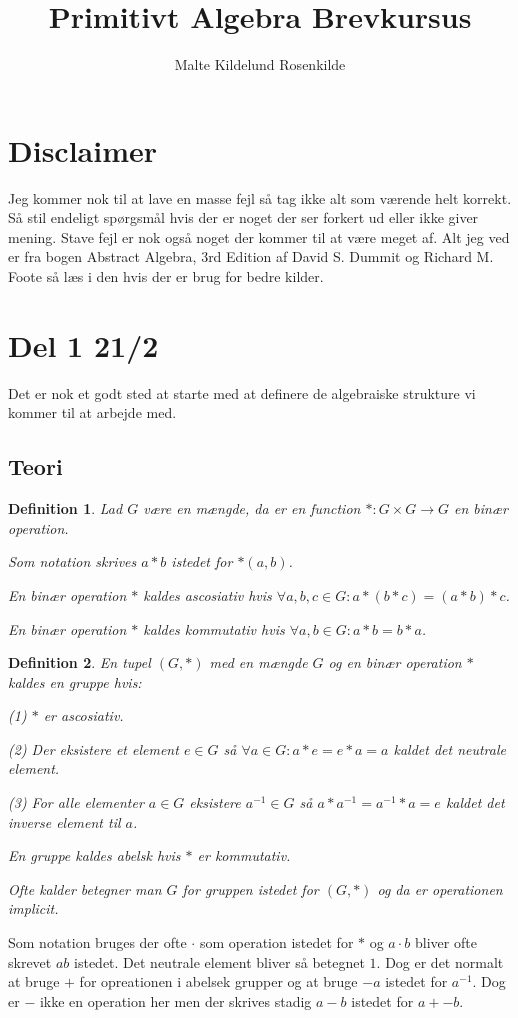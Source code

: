 \documentclass{article}
\title{Primitivt Algebra Brevkursus}
\author{Malte Kildelund Rosenkilde}
\newcommand{\inv}{^{-1}}
\newcommand{\too}{\rightarrow}
\newtheorem{defi}{Definition}
\begin{document}
	\maketitle
	\newpage

	\section*{Disclaimer}
		Jeg kommer nok til at lave en masse fejl så tag ikke alt som værende helt
		korrekt. Så stil endeligt spørgsmål hvis der er noget der ser forkert ud
		eller ikke giver mening.
		Stave fejl er nok også noget der kommer til at være meget af.
		Alt jeg ved er fra bogen
		Abstract Algebra, 3rd Edition af David S. Dummit og Richard M. Foote
		så læs i den hvis der er brug for bedre kilder.
	\section*{Del 1 21/2}
		Det er nok et godt sted at starte med at definere de algebraiske strukture
		vi kommer til at arbejde med.
		\subsection*{Teori}
		\begin{defi}
			Lad $G$ være en mængde, da er en function $*: G \times G \too G$
			en binær operation.

			Som notation skrives $a*b$ istedet for $*(a,b)$.

			En binær operation $*$ kaldes ascosiativ hvis
			$\forall a,b,c \in G: a*(b*c) = (a*b)*c$.

			En binær operation $*$ kaldes kommutativ hvis
			$\forall a,b \in G: a*b = b*a$.
		\end{defi}
		\begin{defi}
			En tupel $(G,*)$ med en mængde $G$ og en binær operation $*$ kaldes
			en gruppe hvis:

			(1) $*$ er ascosiativ.

			(2) Der eksistere et element $e \in G$ så $\forall a \in G: a*e=e*a=a$
			kaldet det neutrale element.

			(3) For alle elementer $a \in G$ eksistere $a\inv \in G$ så
			$a*a\inv = a\inv*a = e$ kaldet det inverse element til $a$.

			En gruppe kaldes abelsk hvis $*$ er kommutativ.

			Ofte kalder betegner man $G$ for gruppen istedet for $(G,*)$ og
			da er operationen implicit.
		\end{defi}
		Som notation bruges der ofte $\cdot$ som operation istedet for $*$ og
		$a\cdot b$ bliver ofte skrevet $ab$ istedet. Det neutrale element bliver så
		betegnet $1$. Dog er det normalt at bruge
		$+$ for opreationen i abelsek grupper og at bruge $-a$ istedet for $a\inv$.
		Dog er $-$ ikke en operation her men der skrives stadig $a-b$ istedet for $a+-b$.
\end{document}
